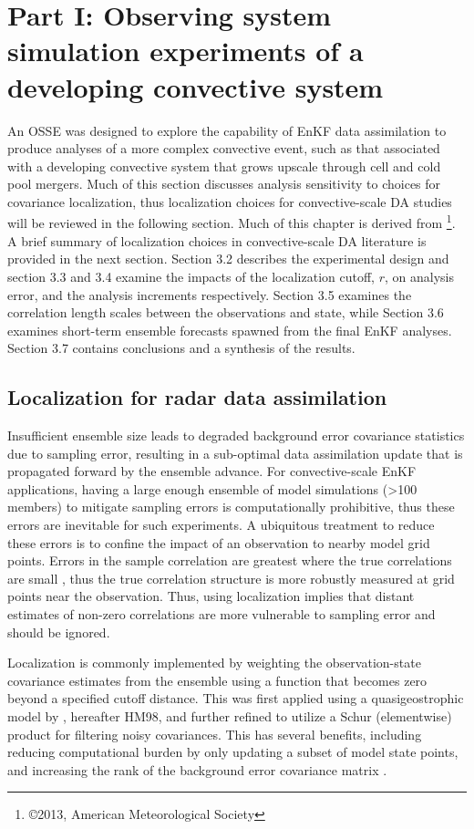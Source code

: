 \chapter{Part I: Observing system simulation experiments of a developing convective system}
\label{osse_chapter}
An OSSE was designed to explore the capability of EnKF data assimilation to produce analyses of a more complex convective event, such as that associated with a developing convective system that grows upscale through cell and cold pool mergers. Much of this section discusses analysis sensitivity to choices for covariance localization, thus localization choices for convective-scale DA studies will be reviewed in the following section. Much of this chapter is derived from \citet{sobashstensrud13}\footnote{\copyright 2013, American Meteorological Society}. A brief summary of localization choices in convective-scale DA literature is provided in the next section. Section 3.2 describes the experimental design and section 3.3 and 3.4 examine the impacts of the localization cutoff, \( r \), on analysis error, and the analysis increments respectively. Section 3.5 examines the correlation length scales between the observations and state, while Section 3.6 examines short-term ensemble forecasts spawned from the final EnKF analyses. Section 3.7 contains conclusions and a synthesis of the results.

\section{Localization for radar data assimilation}
Insufficient ensemble size leads to degraded background error covariance statistics due to sampling error, resulting in a sub-optimal data assimilation update that is propagated forward by the ensemble advance. For convective-scale EnKF applications, having a large enough ensemble of model simulations (\textgreater 100 members) to mitigate sampling errors is computationally prohibitive, thus these errors are inevitable for such experiments. A ubiquitous treatment to reduce these errors is to confine the impact of an observation to nearby model grid points. Errors in the sample correlation are greatest where the true correlations are small \citep{fisher15}, thus the true correlation structure is more robustly measured at grid points near the observation. Thus, using localization implies that distant estimates of non-zero correlations are more vulnerable to sampling error and should be ignored.

Localization is commonly implemented by weighting the observation-state covariance estimates from the ensemble using a function that becomes zero beyond a specified cutoff distance. This was first applied using a quasigeostrophic model by \citet{houtekamermitchell98}, hereafter HM98, and further refined to utilize a Schur (elementwise) product for filtering noisy covariances. This has several benefits, including reducing computational burden by only updating a subset of model state points, and increasing the rank of the background error covariance matrix \citep{hamilletal01}.

